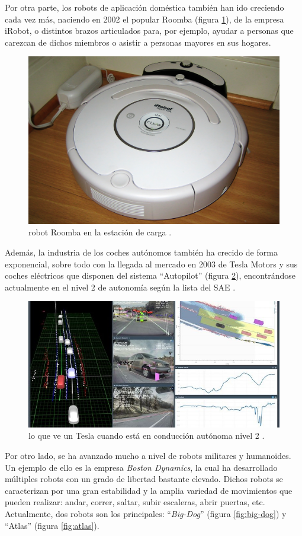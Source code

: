 Por otra parte, los robots de aplicación doméstica también han ido creciendo cada vez más,
naciendo en 2002 el popular Roomba (figura \ref{fig:roomba}), de la empresa iRobot, o distintos brazos articulados
para, por ejemplo, ayudar a personas que carezcan de dichos miembros o asistir a personas
mayores en sus hogares.

\begin{figure}[H]
    \centering
    \includegraphics[width=.5\linewidth]{pictures/Roomba3g.jpg}
    \caption{robot Roomba en la estación de carga \cite{noauthor_history_2020}.}
    \label{fig:roomba}
\end{figure}

Además, la industria de los coches autónomos también ha crecido de forma exponencial,
sobre todo con la llegada al mercado en 2003 de Tesla Motors y sus coches eléctricos
que disponen del sistema ``Autopilot'' (figura \ref{fig:ap}), encontrándose actualmente en el nivel 2 de
autonomía según la lista del SAE \cite{noauthor_teslas_nodate}\cite{noauthor_self-driving_2020}.

\begin{figure}[H]
    \centering
    \includegraphics[width=\linewidth]{pictures/tesla-automation.jpeg}
    \caption{lo que ve un Tesla cuando está en conducción autónoma nivel 2 \cite{baldwin_teslas_2020}.}
    \label{fig:ap}
\end{figure}

Por otro lado, se ha avanzado mucho a nivel de robots militares y humanoides. Un ejemplo
de ello es la empresa \textit{Boston Dynamics}, la cual ha desarrollado múltiples robots
con un grado de libertad bastante elevado. Dichos robots se caracterizan por una gran 
estabilidad y la amplia variedad de movimientos que pueden realizar: andar, correr,
saltar, subir escaleras, abrir puertas, etc. Actualmente, dos robots son los principales:
``\textit{Big-Dog}'' (figura \ref{fig:big-dog}) y ``Atlas'' (figura \ref{fig:atlas}).

